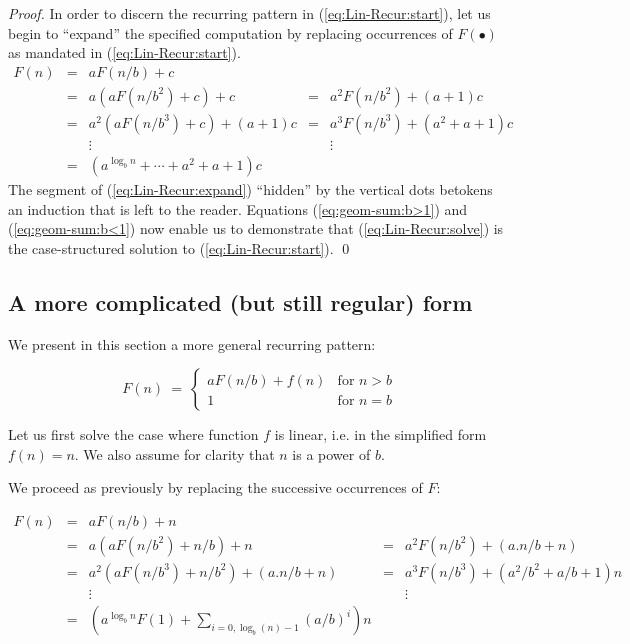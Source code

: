 \begin{proof}
In order to discern the recurring pattern in
(\ref{eq:Lin-Recur:start}), let us begin to ``expand'' the specified
computation by replacing occurrences of $F(\bullet)$ as mandated in
(\ref{eq:Lin-Recur:start}).
\begin{equation}
\label{eq:Lin-Recur:expand}
\begin{array}{lcccc}
F(n) & = & a F(n/b) + c & & \\
     & = & a \left( a F(n/b^2) + c \right) + c
             & = & a^2 F(n/b^2) + (a+1)c \\
     & = & a^2 \left( a F(n/b^3) + c \right) + (a+1)c
             & = & a^3 F(n/b^3) + (a^2+a+1)c \\
     &   & \vdots & & \vdots \\
     & = & 
{\displaystyle
\left(a^{\log_b n} + \cdots +a^2+a+1 \right) c
} & &
\end{array}
\end{equation}
The segment of (\ref{eq:Lin-Recur:expand}) ``hidden'' by the vertical
dots betokens an induction that is left to the reader.  Equations
(\ref{eq:geom-sum:b>1}) and (\ref{eq:geom-sum:b<1}) now enable us to
demonstrate that (\ref{eq:Lin-Recur:solve}) is the case-structured
solution to (\ref{eq:Lin-Recur:start}).  \qed
\end{proof}

\subsection{A more complicated (but still regular) form}

We present in this section a more general recurring pattern:

\begin{equation}
\label{eq:Lin-Recur:general}
F(n) \ = \ \left\{
\begin{array}{cl}
a F(n/b) + f(n) & \mbox{for } n > b \\
1 & \mbox{for } n = b
\end{array}
\right.
\end{equation}

Let us first solve the case where function $f$ is linear, i.e. in the simplified form $f(n) = n$.
We also assume for clarity that $n$ is a power of $b$. 

We proceed as previously by replacing the successive occurrences of $F$:

\begin{equation}
\label{eq:Lin-Recur:expand}
\begin{array}{lcccc}
F(n) & = & a F(n/b) + n & & \\
     & = & a \left( a F(n/b^2) + n/b \right) + n
             & = & a^2 F(n/b^2) + (a.n/b+n) \\
     & = & a^2 \left( a F(n/b^3) + n/b^2 \right) + (a.n/b+n)
             & = & a^3 F(n/b^3) + (a^2/b^2+a/b+1)n \\
     &   & \vdots & & \vdots \\
     & = & 
{\displaystyle
\left(a^{\log_b n}F(1) + \sum_{i=0,\log_b (n)-1} (a/b)^i \right) n
} & &
\end{array}
\end{equation}

